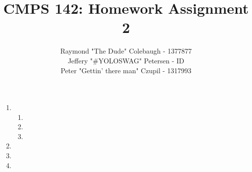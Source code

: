 \documentclass{article}
\title{CMPS 142: Homework Assignment 2}
\author{Raymond "The Dude" Colebaugh - 1377877\\Jeffery "\#YOLOSWAG" Petersen - ID\\Peter "Gettin' there man" Czupil - 1317993}
\begin{document}
\maketitle
\begin{enumerate}
        \item 
            \begin{enumerate}
                \item
                \item 
                \item
            \end{enumerate}
        \item
        \item
        \item
\end{enumerate}
\end{document}
